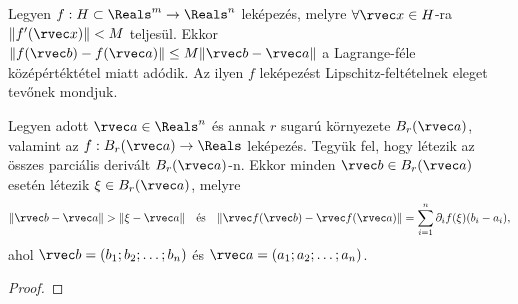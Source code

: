 \begin{definition}
  Legyen $f: H \subset \Reals^m \to \Reals^n$ leképezés, melyre
  $\forall \rvec x \in H$-ra $\|f'(\rvec x)\| < M$ teljesül. Ekkor
  $\|f(\rvec b) - f(\rvec a)\| \leq M \|\rvec b - \rvec a\|$ a Lagrange-féle
  középértéktétel miatt adódik. Az ilyen $f$ leképezést Lipschitz-feltételnek
  eleget tevőnek mondjuk.
\end{definition}

\begin{theorem}
  Legyen adott $\rvec a \in \Reals^n$ és annak $r$ sugarú környezete
  $B_r(\rvec a)$, valamint az $f : B_r(\rvec a) \to \Reals$ leképezés. Tegyük
  fel, hogy létezik az összes parciális derivált $B_r(\rvec a)$-n. Ekkor minden
  $\rvec b \in B_r(\rvec a)$ esetén létezik $\xi \in B_r(\rvec a)$, melyre
  $$
    \|\rvec b - \rvec a\| > \|\xi - \rvec a\|
    \quad \text{és} \quad
    \|\rvec f(\rvec b) - \rvec f(\rvec a)\| = \sum_{i=1}^n \partial_i f(\xi) (b_i - a_i)
    \text,
  $$
  ahol $\rvec b = (b_1; b_2; \ldots; b_n)$ és
  $\rvec a = (a_1; a_2; \ldots; a_n)$.

  \begin{proof}
    \vspace{7em}
  \end{proof}
\end{theorem}